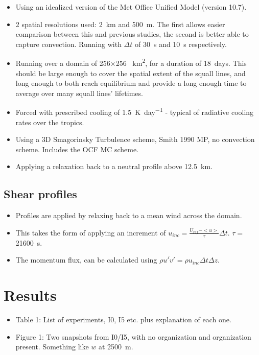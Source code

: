 \documentclass[11pt,a4paper]{article}
\newcommand*\mean[1]{\overline{#1}}
\begin{document}
\begin{itemize}
    \item Using an idealized version of the Met Office Unified Model (version 10.7).
    \item 2 spatial resolutions used: \SI{2}{km} and \SI{500}{m}. The first allows easier comparison between this and previous studies, the second is better able to capture convection. Running with $\Delta t$ of \SI{30}{s} and \SI{10}{s} respectively.
    \item Running over a domain of 256$\times$256 \SI{}{km^2}, for a duration of \SI{18}{days}. This should be large enough to cover the spatial extent of the squall lines, and long enough to both reach equilibrium and provide a long enough time to average over many squall lines' lifetimes.
    \item Forced with prescribed cooling of \SI{1.5}{K.day^{-1}} - typical of radiative cooling rates over the tropics.
    \item Using a 3D Smagorinsky Turbulence scheme, Smith 1990 MP, no convection scheme. Includes the OCF MC scheme.
    \item Applying a relaxation back to a neutral profile above \SI{12.5}{km}.
\end{itemize}

\subsection{Shear profiles}

\begin{itemize}
    \item Profiles are applied by relaxing back to a mean wind across the domain.
    \item This takes the form of applying an increment of $u_{inc} = \frac{U_{ref} - <u>}{\tau} \Delta t$. $\tau = $ \SI{21600}{s}.
    \item The momentum flux, can be calculated using $\rho \mean{u' v'} = \rho u_{inc}  \Delta t \Delta z$.
\end{itemize}

\section{Results}
\begin{itemize}
   \item Table 1: List of experiments, I0, I5 etc. plus explanation of each one.

   \item Figure 1: Two snapshots from I0/I5, with no organization and organization present. Something like $w$ at \SI{2500}{m}.
\end{itemize}
\end{document}
